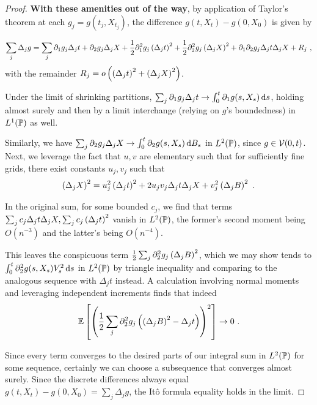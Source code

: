 \documentclass{article}
\begin{document}
\begin{proof}
  \textbf{With these amenities out of the way}, by application of Taylor's theorem at each \(g_j=g(t_j,X_{t_j})\), the difference \(g(t, X_t)-g(0, X_0)\) is given by

  \[
    \sum_j\Delta_jg=\sum_j\partial_1g_j\Delta_jt+\partial_2g_j\Delta_jX+\frac{1}{2}\partial_1^2 g_j\pa{\Delta_jt}^2+\frac{1}{2}\partial_2^2g_j\pa{\Delta_jX}^2+\partial_1\partial_2g_j\Delta_jt\Delta_jX+R_j\,\,,
  \]
  with the remainder \(R_j=o\pa{\pa{\Delta_jt}^2+\pa{\Delta_jX}^2}\).

  Under the limit of shrinking partitions, \(\sum_j\partial_1g_j\Delta_jt\rightarrow\int_0^t\partial_1g(s,X_s)\d{s}\), holding almost surely and then by a limit interchange (relying on \(g\)'s boundedness) in \(L^1(\P)\) as well.

  Similarly, we have \(\sum_j\partial_2g_j\Delta_jX\rightarrow\int_0^t\partial_2g(s,X_s)\d{B_s}\) in \(L^2(\P)\), since \(g\in \mcV(0,t)\). Next, we leverage the fact that \(u,v\) are elementary such that for sufficiently fine grids, there exist constants \(u_j,v_j\) such that
  \[
    \pa{\Delta_j X}^2=u_j^2\pa{\Delta_jt}^2+2u_jv_j\Delta_jt\Delta_jX+v_j^2\pa{\Delta_jB}^2\,\,.
  \]

  In the original sum, for some bounded \(c_j\), we find that terms \(\sum_jc_j\Delta_jt\Delta_jX,\sum_jc_j\pa{\Delta_jt}^2\) vanish in \(L^2(\P)\), the former's second moment being \(O(n^{-3})\) and the latter's being \(O(n^{-4})\).

  This leaves the conspicuous term \(\frac{1}{2}\sum_j\partial_2^2g_j\pa{\Delta_jB}^2\), which we may show tends to \(\int_0^t\partial_2^2g(s, X_s)V_s^2\d{s}\) in \(L^2(\P)\) by triangle inequality and comparing to the analogous sequence with \(\Delta_jt\) instead. A calculation involving normal moments and leveraging independent increments finds that indeed
  \[\E\ha{\pa{\frac{1}{2}\sum_j\partial_2^2g_j\pa{\pa{\Delta_jB}^2-\Delta_jt}}^2}\rightarrow 0\,\,.\]

  Since every term converges to the desired parts of our integral sum in \(L^2(\P)\) for some sequence, certainly we can choose a subsequence that converges almost surely. Since the discrete differences always equal \(g(t, X_t)-g(0, X_0)=\sum_j\Delta_jg\), the It\^{o} formula equality holds in the limit.
    \end{proof}
\end{document}
